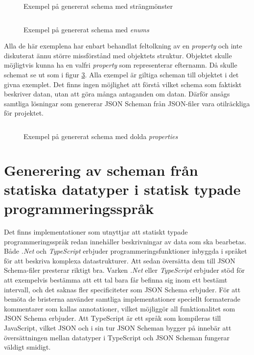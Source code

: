 \begin{figure}
	\inputminted[tabsize=2, frame=single, fontsize=\small, framesep=2mm]{json}{code/schema-generation-example/schema-example2.json}
	\vspace{-1.7em}
	\caption{Exempel på genererat schema med strängmönster}
	\label{fig:schema-super-simple-example-2}
\end{figure}

\begin{figure}
	\inputminted[tabsize=2, frame=single, fontsize=\small, framesep=2mm]{json}{code/schema-generation-example/schema-example3.json}
	\vspace{-1.7em}
	\caption{Exempel på genererat schema med \textit{enums}}
	\label{fig:schema-super-simple-example-3}
\end{figure}

Alla de här exemplena har enbart behandlat feltolkning av en \textit{property} och inte diskuterat ännu större missförstånd med objektets struktur. Objektet skulle möjligtvis kunna ha en valfri \textit{property} som representerar efternamn. Då skulle schemat se ut som i figur \ref{fig:schema-super-simple-example-4}. Alla exempel är giltiga scheman till objektet i det givna exemplet. Det finns ingen möjlighet att förstå vilket schema som faktiskt beskriver datan, utan att göra många antaganden om datan. Därför ansågs samtliga lösningar som genererar JSON Scheman från JSON-filer vara otilräckliga för projektet.

\begin{figure}
	\inputminted[tabsize=2, frame=single, fontsize=\small, framesep=2mm]{json}{code/schema-generation-example/schema-example4.json}
	\vspace{-1.7em}
	\caption{Exempel på genererat schema med dolda \textit{properties}}
	\label{fig:schema-super-simple-example-4}
\end{figure}

\section{Generering av scheman från statiska datatyper i statisk typade programmeringsspråk}
Det finns implementationer som utnyttjar att statiskt typade programmeringsspråk redan innehåller beskrivningar av data som ska bearbetas. Både \textit{.Net} och \textit{TypeScript} erbjuder programmeringsfunktioner inbyggda i språket för att beskriva komplexa datastrukturer. Att sedan översätta dem till JSON Schema-filer presterar riktigt bra. Varken \textit{.Net} eller \textit{TypeScript} erbjuder stöd för att exempelvis bestämma att ett tal bara får befinna sig inom ett bestämt intervall, och det saknas fler specificiteter som JSON Schema erbjuder. För att bemöta de bristerna använder samtliga implementationer speciellt formaterade kommentarer som kallas annotationer, vilket möjliggör all funktionalitet som JSON Schema erbjuder. Att TypeScript är ett språk som kompileras till JavaScript, vilket JSON och i sin tur JSON Scheman bygger på innebär att översättningen mellan datatyper i TypeScript och JSON Scheman fungerar väldigt smidigt. \cite{Newtonsoft,Suter,El-Dardiry,Bovet}


